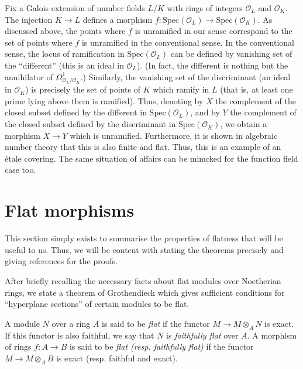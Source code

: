 \begin{example}
\label{example-number-theory-etale}
Fix a Galois extension of number fields $L/K$ with rings of integers 
$\mathcal{O}_L$
and $\mathcal{O}_K$. The injection $K \to L$ defines a morphism
$f:\text{Spec}(\mathcal{O}_L) \to \text{Spec}(\mathcal{O}_K)$. As discussed 
above, the points where $f$
is unramified in our sense correspond to the set of points where $f$ is
unramified in the conventional sense. In the conventional sense, the locus of
ramification in $\text{Spec}(\mathcal{O}_L)$ can be defined by vanishing set of 
the
``different'' (this is an ideal in $\mathcal{O}_L$). (In fact, the different is
nothing but the annihilator of $\Omega^1_{\mathcal{O}_L/\mathcal{O}_K}$.) 
Similarly, the
vanishing set of the discriminant (an ideal in $\mathcal{O}_K$) is precisely 
the set
of points of $K$ which ramify in $L$ (that is, at least one prime lying above
them is ramified). Thus, denoting by $X$ the complement of the closed subset
defined by the different in $\text{Spec}(\mathcal{O}_L)$, and by $Y$ the 
complement of the
closed subset defined by the discriminant in $\text{Spec}(\mathcal{O}_K)$, we 
obtain a
morphism $X \to Y$ which is unramified. Furthermore, it is shown in algebraic
number theory that this is also finite and flat. Thus, this is an example of
an \'etale covering. The same situation of affairs can be mimcked for the
function field case too.
\end{example}

\section{Flat morphisms}
\label{section-flat-moprhisms}

\noindent
This section simply exists to summarise the properties of flatness that will
be useful to us. Thus, we will be content with stating the theorems precisely
and giving references for the proofs.

\medskip\noindent
After briefly recalling the necessary facts about flat modules over Noetherian
rings, we state a theorem of Grothendieck which gives sufficient conditions
for ``hyperplane sections'' of certain modules to be flat.

\begin{definition}
\label{definition-flat-rings}
A module $N$ over a ring $A$ is said to be {\it flat} if the functor
$M \to M \otimes_A N$ is exact. If this functor is also faithful, we say that
$N$ is {\it faithfully flat}
over $A$. A morphism of rings $f:A \to B$ is said to be
{\it flat (resp. faithfully flat)}
if the functor $M \to M \otimes_A B$ is exact
(resp. faithful and exact). 
\end{definition}

